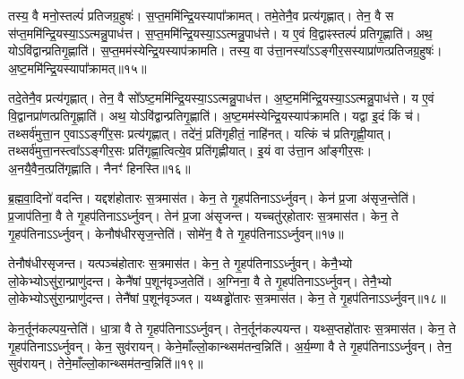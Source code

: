 तस्य॒ वै मनो॒स्तल्पं॑ प्रति\-जग्र॒हुषः॑।
स॒प्त॒ममि॑न्द्रि॒य\-स्यापा᳚\-क्रामत्।
तमे॒तेनै॒व प्रत्य॑\-गृह्णात्।
तेन॒ वै स स॑प्त॒ममि॑न्द्रि॒य\-स्या॒\-ऽऽत्मन्नु॒पा\-ध॑त्त।
स॒प्त॒ममि॑न्द्रि॒य\-स्या॒\-ऽऽत्मन्नु॒पा\-ध॑त्ते।
य ए॒वं वि॒द्वाꣴस्तल्पं॑ प्रति\-गृ॒ह्णाति॑।
अथ॒ यो\-ऽवि॑द्वान्प्रति\-गृ॒ह्णाति॑।
स॒प्त॒मम॑स्येन्द्रि॒य\-स्याप॑\-क्रामति।
तस्य॒ वा उ॑त्ता॒नस्या᳚\-ऽऽङ्गीर॒सस्याप्रा॑णत्प्रति\-जग्र॒हुषः॑।
अ॒ष्ट॒ममि॑न्द्रि॒य\-स्यापा᳚क्रामत्॥१५॥\ip

तदे॒तेनै॒व प्रत्य॑गृह्णात्।
तेन॒ वै सो᳚\-ऽष्ट॒ममि॑न्द्रि॒य\-स्या॒\-ऽऽत्मन्नु॒पा\-ध॑त्त।
अ॒ष्ट॒ममि॑न्द्रि॒य\-स्या॒\-ऽऽत्मन्नु॒पा\-ध॑त्ते।
य ए॒वं वि॒द्वानप्रा॑णत्प्रति\-गृ॒ह्णाति॑।
अथ॒ योऽवि॑द्वान्प्रति\-गृ॒ह्णाति॑।
अ॒ष्ट॒मम॑स्येन्द्रि॒य\-स्याप॑\-क्रामति।
यद्वा इ॒दं किं च॑।
तथ्सर्व॑मुत्ता॒न ए॒वा\-ऽऽङ्गी॑र॒सः प्रत्य॑\-गृह्णात्।
तदे॑नं॒ प्रति॑\-गृहीतं॒ नाहि॑नत्।
यत्किं च॑ प्रति\-गृह्णी॒यात्।
तथ्सर्व॑मुत्ता॒नस्त्वा᳚\-ऽऽङ्गीर॒सः प्रति॑\-गृह्णा॒त्वित्ये॒व प्रति॑\-गृह्णीयात्।
इ॒यं वा उ॑त्ता॒न आ᳚ङ्गीर॒सः।
अ॒नयै॒वैन॒त्प्रति॑\-गृह्णाति।
नैनꣳ॑ हिनस्ति॥१६॥\ip{}

ब्र॒ह्म॒वा॒दिनो॑ वदन्ति।
यद्दश॑होतारः स॒त्रमास॑त।
केन॒ ते गृ॒हप॑तिना\-ऽऽर्ध्नुवन्।
केन॑ प्र॒जा अ॑सृज॒न्तेति॑।
प्र॒जा\-प॑तिना॒ वै ते गृ॒हप॑तिना\-ऽऽर्ध्नुवन्।
तेन॑ प्र॒जा अ॑सृजन्त।
यच्चतु॑र्‌\mbox{}होतारः स॒त्रमास॑त।
केन॒ ते गृ॒हप॑तिना\-ऽऽर्ध्नुवन्।
केनौष॑धीरसृज॒न्तेति॑।
सोमे॑न॒ वै ते गृ॒हप॑तिना\-ऽऽर्ध्नुवन्॥१७॥\ip

तेनौष॑धीरसृजन्त।
यत्पञ्च॑होतारः स॒त्रमास॑त।
केन॒ ते गृ॒हप॑तिना\-ऽऽर्ध्नुवन्।
केनै॒भ्यो लो॒केभ्यो\-ऽसु॑रा॒न्प्राणु॑दन्त।
केनै॑षां प॒शून॑वृञ्ज॒तेति॑।
अ॒ग्निना॒ वै ते गृ॒हप॑तिना\-ऽऽर्ध्नुवन्।
तेनै॒भ्यो लो॒केभ्यो\-ऽसु॑रा॒न्प्राणु॑दन्त।
तेनै॑षां प॒शून॑वृञ्जत।
यथ्षड्ढो॑तारः स॒त्रमास॑त।
केन॒ ते गृ॒हप॑तिना\-ऽऽर्ध्नुवन्॥१८॥\ip

केन॒र्तून॑कल्पय॒न्तेति॑।
धा॒त्रा वै ते गृ॒हप॑तिना\-ऽऽर्ध्नुवन्।
तेन॒र्तून॑कल्पयन्त।
यथ्स॒प्तहो॑तारः स॒त्रमास॑त।
केन॒ ते गृ॒हप॑तिना\-ऽऽर्ध्नुवन्।
केन॒ सुव॑रायन्।
केने॒माँल्लो॒कान्थ्सम॑\-तन्व॒न्निति॑।
अ॒र्य॒म्णा वै ते गृ॒हप॑तिना\-ऽऽर्ध्नुवन्।
तेन॒ सुव॑रायन्।
तेने॒माँल्लो॒कान्थ्सम॑तन्व॒न्निति॑॥१९॥\ip

